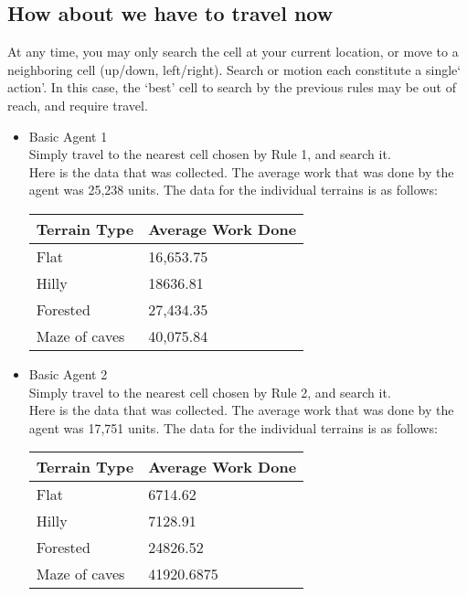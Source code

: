 \documentclass[12pt]{article} %
\begin{document}
\begin{itemize}
\subsection{How about we have to travel now}
At  any  time,  you  may  only  search  the  cell  at  your current location, or move to a neighboring cell (up/down, left/right).  Search or motion each constitute a single‘ action’.  In this case, the ‘best’ cell to search by the previous rules may be out of reach, and require travel.
\begin{itemize}
\item Basic Agent 1\\
Simply travel to the nearest cell chosen by Rule 1, and search it.\\
Here is the data that was collected. The average work that was done by the agent was 25,238 units. The data for the individual terrains is as follows:
\begin{center}
\begin{table}[H]
\begin{tabular}{|l|l|}
\hline
Terrain Type  & Average Work Done \\ \hline
Flat          & 16,653.75         \\ \hline
Hilly         & 18636.81          \\ \hline
Forested      & 27,434.35         \\ \hline
Maze of caves & 40,075.84         \\ \hline
\end{tabular}
\end{table}
\end{center}
\item Basic Agent 2\\
Simply travel to the nearest cell chosen by Rule 2, and search it.\\
Here is the data that was collected. The average work that was done by the agent was 17,751 units. The data for the individual terrains is as follows:
\begin{table}[H]
\begin{tabular}{|l|l|}
\hline
Terrain Type  & Average Work Done \\ \hline
Flat          & 6714.62           \\ \hline
Hilly         & 7128.91           \\ \hline
Forested      & 24826.52          \\ \hline
Maze of caves & 41920.6875        \\ \hline
\end{tabular}

\end{table}
\end{itemize}
\end{itemize}
\end{document}
